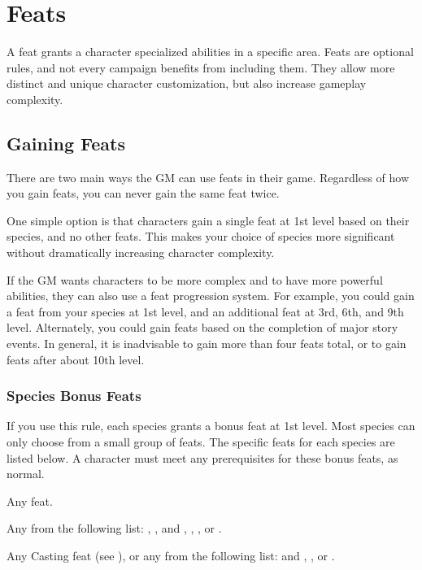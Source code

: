\chapter{Feats}\label{Feats}

A feat grants a character specialized abilities in a specific area.
Feats are optional rules, and not every campaign benefits from including them.
They allow more distinct and unique character customization, but also increase gameplay complexity.

\section{Gaining Feats}
  There are two main ways the GM can use feats in their game.
  Regardless of how you gain feats, you can never gain the same feat twice.

  One simple option is that characters gain a single feat at 1st level based on their species, and no other feats.
  This makes your choice of species more significant without dramatically increasing character complexity.

  If the GM wants characters to be more complex and to have more powerful abilities, they can also use a feat progression system.
  For example, you could gain a feat from your species at 1st level, and an additional feat at 3rd, 6th, and 9th level.
  Alternately, you could gain feats based on the completion of major story events.
  In general, it is inadvisable to gain more than four feats total, or to gain feats after about 10th level.

  \subsection{Species Bonus Feats}\label{Species Bonus Feats}
    If you use this rule, each species grants a bonus feat at 1st level.
    Most species can only choose from a small group of feats.
    The specific feats for each species are listed below.
    A character must meet any prerequisites for these bonus feats, as normal.

     Any feat.

     Any from the following list: , ,  and , , , or .

     Any Casting feat (see ), or any from the following list:  and , , or .

